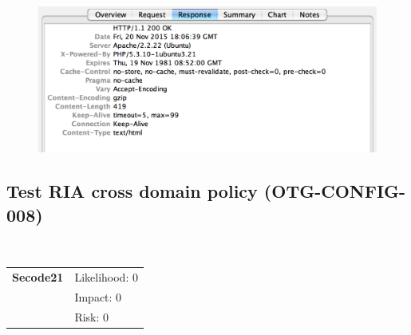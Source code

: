 \documentclass[headsepline,footsepline,footinclude=false,oneside,fontsize=11pt,paper=a4,listof=totoc,bibliography=totoc]{scrbook} %
\begin{document}
\begin{figure}[H]
\centering
\includegraphics[scale=0.6]{figures/charles_results}
\end{figure}

\pagebreak

\pagebreak
\subsection{Test RIA cross domain policy (OTG-CONFIG-008)}\
\begin{tabular}{cR{12cm}}
	\textbf{Secode21} & Likelihood: 0\\& Impact: 0\\& Risk: 0
\end{tabular}
\end{document}
